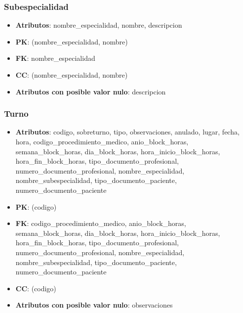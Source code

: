 \documentclass[a4paper,11pt]{article}
\begin{document}
\subsubsection{\textbf{Subespecialidad}}

\begin{itemize}

\item 
\textbf{Atributos}: nombre\_especialidad, nombre, descripcion

\item 
\textbf{PK}: (nombre\_especialidad, nombre)

\item
\textbf{FK}: nombre\_especialidad

\item 
\textbf{CC}: (nombre\_especialidad, nombre)

\item 
\textbf{Atributos con posible valor nulo}: descripcion

\end{itemize}
\subsubsection{\textbf{Turno}}

\begin{itemize}

\item 
\textbf{Atributos}: codigo, sobreturno, tipo, observaciones, anulado, lugar, fecha, hora,  codigo\_procedimiento\_medico, 
anio\_block\_horas, semana\_block\_horas, dia\_block\_horas, hora\_inicio\_block\_horas, hora\_fin\_block\_horas,
tipo\_documento\_profesional, numero\_documento\_profesional, nombre\_especialidad, 
nombre\_subespecialidad, tipo\_documento\_paciente, numero\_documento\_paciente

\item 
\textbf{PK}: (codigo)

\item
\textbf{FK}: codigo\_procedimiento\_medico, 
anio\_block\_horas, semana\_block\_horas, dia\_block\_horas, hora\_inicio\_block\_horas, hora\_fin\_block\_horas,
tipo\_documento\_profesional, numero\_documento\_profesional, nombre\_especialidad,
nombre\_subespecialidad, tipo\_documento\_paciente, numero\_documento\_paciente

\item 
\textbf{CC}: (codigo)

\item 
\textbf{Atributos con posible valor nulo}: observaciones

\end{itemize}
\end{document}
